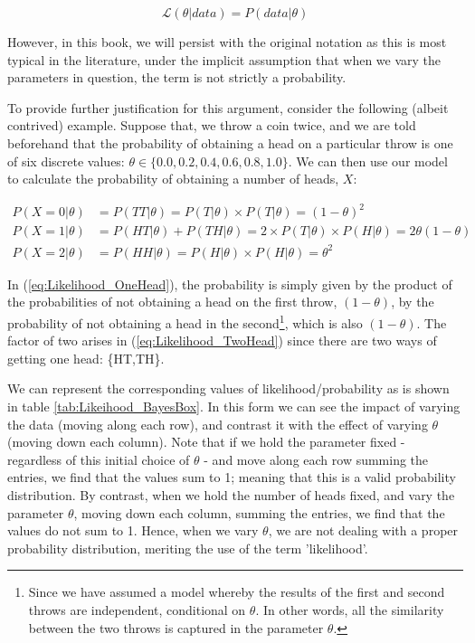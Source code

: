 \documentclass[11pt,fullpage]{book}
\begin{document}
\begin{equation}\label{eq:Likelihood_notation}
\mathcal{L}(\theta|data) = P(data|\theta)
\end{equation}

However, in this book, we will persist with the original notation as this is most typical in the literature, under the implicit assumption that when we vary the parameters in question, the term is not strictly a probability.

To provide further justification for this argument, consider the following (albeit contrived) example. Suppose that, we throw a coin twice, and we are told beforehand that the probability of obtaining a head on a particular throw is one of six discrete values: $\theta\in\{0.0,0.2,0.4,0.6,0.8,1.0\}$. We can then use our model to calculate the probability of obtaining a number of heads, $X$:

\begin{align}\label{eq:Likelihood_OneHead}
P(X = 0|\theta)& = P(TT|\theta) = P(T|\theta)\times P(T|\theta) = (1-\theta)^2\\
P(X = 1|\theta)& = P(HT|\theta) + P(TH|\theta) = 2\times P(T|\theta)\times P(H|\theta) = 2\theta(1-\theta)\\\label{eq:Likelihood_TwoHead}
P(X = 2|\theta)& = P(HH|\theta) = P(H|\theta)\times P(H|\theta) = \theta^2
\end{align}

In (\ref{eq:Likelihood_OneHead}), the probability is simply given by the product of the probabilities of not obtaining a head on the first throw, $(1-\theta)$, by the probability of not obtaining a head in the second\footnote{Since we have assumed a model whereby the results of the first and second throws are independent, conditional on $\theta$. In other words, all the similarity between the two throws is captured in the parameter $\theta$.}, which is also $(1-\theta)$. The factor of two arises in (\ref{eq:Likelihood_TwoHead}) since there are two ways of getting one head: \{HT,TH\}.

We can represent the corresponding values of likelihood/probability as is shown in table \ref{tab:Likeihood_BayesBox}. In this form we can see the impact of varying the data (moving along each row), and contrast it with the effect of varying $\theta$ (moving down each column). Note that if we hold the parameter fixed - regardless of this initial choice of $\theta$ - and move along each row summing the entries, we find that the values sum to 1; meaning that this is a valid probability distribution. By contrast, when we hold the number of heads fixed, and vary the parameter $\theta$, moving down each column, summing the entries, we find that the values do not sum to 1. Hence, when we vary $\theta$, we are not dealing with a proper probability distribution, meriting the use of the term 'likelihood'.
\end{document}
